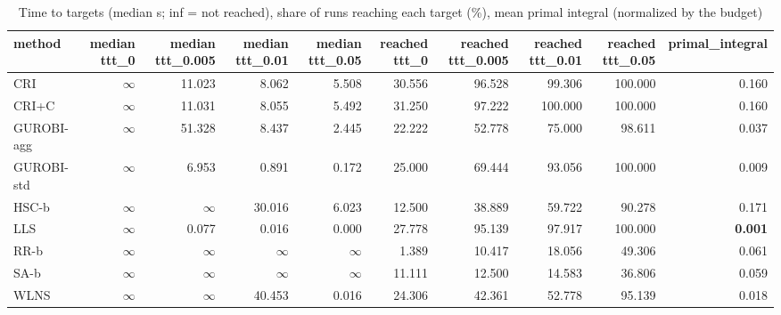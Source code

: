 \begin{table}[htbp]
\centering
\small
\caption{Time to targets (median s; inf = not reached), share of runs reaching each target (\%), mean primal integral (normalized by the budget)}
\label{tab:E4b_equal_budgets_60s_b60_ttt}
\begin{tabular}{lrrrrrrrrr}
\toprule
method & median ttt\_0 & median ttt\_0.005 & median ttt\_0.01 & median ttt\_0.05 & reached ttt\_0 & reached ttt\_0.005 & reached ttt\_0.01 & reached ttt\_0.05 & primal\_integral \\
\midrule
CRI & $\infty$ & 11.023 & 8.062 & 5.508 & 30.556 & 96.528 & 99.306 & 100.000 & 0.160 \\
CRI+C & $\infty$ & 11.031 & 8.055 & 5.492 & 31.250 & 97.222 & 100.000 & 100.000 & 0.160 \\
GUROBI-agg & $\infty$ & 51.328 & 8.437 & 2.445 & 22.222 & 52.778 & 75.000 & 98.611 & 0.037 \\
GUROBI-std & $\infty$ & 6.953 & 0.891 & 0.172 & 25.000 & 69.444 & 93.056 & 100.000 & 0.009 \\
HSC-b & $\infty$ & $\infty$ & 30.016 & 6.023 & 12.500 & 38.889 & 59.722 & 90.278 & 0.171 \\
LLS & $\infty$ & 0.077 & 0.016 & 0.000 & 27.778 & 95.139 & 97.917 & 100.000 & \textbf{0.001} \\
RR-b & $\infty$ & $\infty$ & $\infty$ & $\infty$ & 1.389 & 10.417 & 18.056 & 49.306 & 0.061 \\
SA-b & $\infty$ & $\infty$ & $\infty$ & $\infty$ & 11.111 & 12.500 & 14.583 & 36.806 & 0.059 \\
WLNS & $\infty$ & $\infty$ & 40.453 & 0.016 & 24.306 & 42.361 & 52.778 & 95.139 & 0.018 \\
\bottomrule
\end{tabular}
\end{table}
